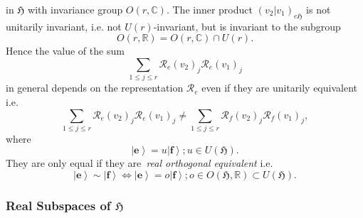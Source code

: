 \documentclass[aps,preprint]{revtex4}
\begin{document}
in $\mathfrak{H}$ with invariance group $O\left( r,\mathbb{C}\right) .$ The
inner product $\left( \left. v_{2}\right\vert v_{1}\right) _{e\mathfrak{H}}$
is not unitarily invariant, i.e. not $U\left( r\right) $-invariant, but is
invariant to the subgroup 
\begin{equation}
O\left( r,\mathbb{R}\right) =O\left( r,\mathbb{C}\right) \cap U\left(
r\right) .
\end{equation}%
Hence the value of the sum 
\begin{equation}
\sum_{1\leq j\leq r}\mathcal{R}_{e}\left( v_{2}\right) _{j}\mathcal{R}%
_{e}\left( v_{1}\right) _{j}
\end{equation}%
in general depends on the representation $\mathcal{R}_{e}$ even if they are
unitarily equivalent i.e. 
\begin{equation}
\sum_{1\leq j\leq r}\mathcal{R}_{e}\left( v_{2}\right) _{j}\mathcal{R}%
_{e}\left( v_{1}\right) _{j}\neq \sum_{1\leq j\leq r}\mathcal{R}_{f}\left(
v_{2}\right) _{j}\mathcal{R}_{f}\left( v_{1}\right) _{j},
\end{equation}%
where 
\begin{equation}
\left\vert \mathbf{e}\right\rangle =u\left\vert \mathbf{f}\right\rangle
;u\in U\left( \mathfrak{H}\right) .
\end{equation}%
They are only equal if they are\emph{\ real orthogonal equivalent} i.e. 
\begin{equation}
\left\vert \mathbf{e}\right\rangle \sim \left\vert \mathbf{f}\right\rangle
\Leftrightarrow \left\vert \mathbf{e}\right\rangle =o\left\vert \mathbf{f}%
\right\rangle ;o\in O\left( \mathfrak{H,}\mathbb{R}\right) \subset U\left( 
\mathfrak{H}\right) .
\end{equation}

\subsubsection{Real Subspaces of $\mathfrak{H}$}
\end{document}

